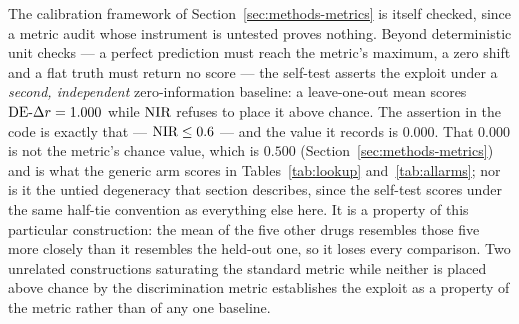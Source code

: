 The calibration framework of Section~\ref{sec:methods-metrics} is itself checked, since a metric
audit whose instrument is untested proves nothing. Beyond deterministic unit checks --- a perfect
prediction must reach the metric's maximum, a zero shift and a flat truth must return no score ---
the self-test asserts the exploit under a \emph{second, independent} zero-information baseline: a
leave-one-out mean scores $\textrm{DE-}\Delta r = 1.000$ while $\textrm{NIR}$ refuses to place it above chance. The
assertion in the code is exactly that --- $\textrm{NIR} \leq 0.6$ --- and the value it records is $0.000$.
That $0.000$ is not the metric's chance value, which is $0.500$
(Section~\ref{sec:methods-metrics}) and is what the generic arm scores in
Tables~\ref{tab:lookup} and~\ref{tab:allarms}; nor is it the untied degeneracy that section
describes, since the self-test scores under the same half-tie convention as everything else here. It
is a property of this particular construction: the mean of the five other drugs resembles those five
more closely than it resembles the held-out one, so it loses every comparison. Two unrelated
constructions saturating the standard metric while neither is placed above chance by the
discrimination metric establishes the exploit as a property of the metric rather than of any one
baseline.
